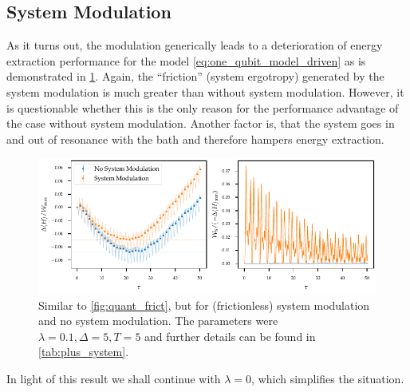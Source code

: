 \subsection{System Modulation}
\label{sec:sys_mod_v_no_sys_mod}
As it turns out, the modulation generically leads to a deterioration
of energy extraction performance for the model
\cref{eq:one_qubit_model_driven} as is demonstrated in
\cref{fig:quant_frict_sys_no_sys}. Again, the ``friction'' (system
ergotropy) generated by the system modulation is much greater than
without system modulation. However, it is questionable whether this is
the only reason for the performance advantage of the case without
system modulation. Another factor is, that the system goes in and out
of resonance with the bath and therefore hampers energy
extraction.
\begin{figure}[h]
  \centering
  \includegraphics{figs/one_bath_mod/system_vs_no_system}
  \caption{\label{fig:quant_frict_sys_no_sys} Similar to
    \cref{fig:quant_frict}, but for (frictionless) system modulation
    and no system modulation. The parameters were \(λ=0.1, Δ=5, T=5\)
    and further details can be found in \cref{tab:plus_system}.}
\end{figure}

In light of this result we shall continue with \(λ=0\), which
simplifies the situation.

